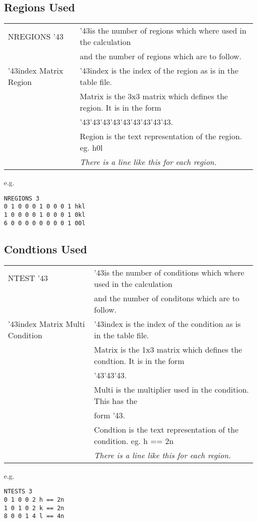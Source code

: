 \documentclass[11pt]{article}
\newcommand{\hash}{\char '43} %
\begin{document}
\subsection{Regions Used}
\begin{table}[h]
\begin{tabular}{|l|l|}\hline
NREGIONS \hash & \hash is the number of regions which where used in the calculation\\
		&	and the number of regions which are to follow.\\
\hline
\hash index Matrix Region & \hash index is the index of the region as is in the table file.\\
					& Matrix is the 3x3 matrix which defines the region. It is in the form\\
					& \hash  \hash  \hash  \hash  \hash  \hash  \hash  \hash  \hash.\\
					& Region is the text representation of the region. eg. h0l\\
					& \emph{There is a line like this for each region.}\\
\hline
\end{tabular}
\end{table}
e.g.
\begin{verbatim}
NREGIONS 3
0 1 0 0 0 1 0 0 0 1 hkl
1 0 0 0 0 1 0 0 0 1 0kl
6 0 0 0 0 0 0 0 0 1 00l
\end{verbatim}
\subsection{Condtions Used}
\begin{table}[h]
\begin{tabular}{|l|l|}\hline
NTEST \hash & \hash is the number of conditions which where used in the calculation\\
		&	and the number of conditons which are to follow.\\
\hline
\hash index Matrix Multi Condition & \hash index is the index of the condition as is in the table file.\\
					& Matrix is the 1x3 matrix which defines the condtion. It is in the form\\
					& \hash  \hash  \hash.\\
					& Multi is the multiplier used in the condition. This has the \\
					& form \hash.\\
					& Condtion is the text representation of the condition. eg. h == 2n\\
					& \emph{There is a line like this for each region.}\\
\hline
\end{tabular}
\end{table}
e.g.
\begin{verbatim}
NTESTS 3
0 1 0 0 2 h == 2n
1 0 1 0 2 k == 2n
8 0 0 1 4 l == 4n
\end{verbatim}
\end{document}
